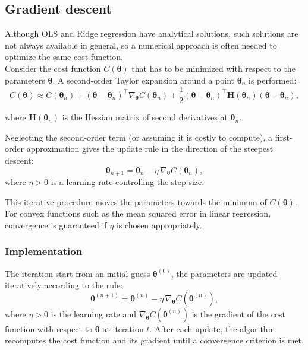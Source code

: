 \documentclass[
 reprint,            %
 amsmath,amssymb,
 aps,
]{revtex4-2}
\begin{document}
\subsection{Gradient descent}

Although OLS and Ridge regression have analytical solutions, such solutions are not always available in general, so a numerical approach is often needed to optimize the same cost function.\\

Consider the cost function $C(\boldsymbol{\theta})$ that has to be minimized with respect to the parameters $\boldsymbol{\theta}$\cite{hjorthjensen_week36}.  
A second-order Taylor expansion around a point $\boldsymbol{\theta}_n$ is performed:
$$
C(\boldsymbol{\theta}) \approx C(\boldsymbol{\theta}_n) + (\boldsymbol{\theta}-\boldsymbol{\theta}_n)^\top \nabla_{\boldsymbol{\theta}} C(\boldsymbol{\theta}_n) 
+ \frac{1}{2} (\boldsymbol{\theta}-\boldsymbol{\theta}_n)^\top \mathbf{H}(\boldsymbol{\theta}_n) (\boldsymbol{\theta}-\boldsymbol{\theta}_n),
$$

where $\mathbf{H}(\boldsymbol{\theta}_n)$ is the Hessian matrix of second derivatives at $\boldsymbol{\theta}_n$.

Neglecting the second-order term (or assuming it is costly to compute), a first-order approximation gives the update rule in the direction of the steepest descent:
\[
\boldsymbol{\theta}_{n+1} = \boldsymbol{\theta}_n - \eta \, \nabla_{\boldsymbol{\theta}} C(\boldsymbol{\theta}_n),
\]
where $\eta > 0$ is a learning rate controlling the step size.  

This iterative procedure moves the parameters towards the minimum of $C(\boldsymbol{\theta})$. For convex functions such as the mean squared error in linear regression, convergence is guaranteed if $\eta$ is chosen appropriately.

\subsubsection{Implementation}
The iteration start from an initial guess $\boldsymbol{\theta}^{(0)}$, the parameters are updated iteratively according to the rule:
\[
\boldsymbol{\theta}^{(n+1)} = \boldsymbol{\theta}^{(n)} - \eta \, \nabla_{\boldsymbol{\theta}} C(\boldsymbol{\theta}^{(n)}),
\]
where $\eta > 0$ is the learning rate and $\nabla_{\boldsymbol{\theta}} C(\boldsymbol{\theta}^{(n)})$ is the gradient of the cost function with respect to $\boldsymbol{\theta}$ at iteration $t$.
After each update, the algorithm recomputes the cost function and its gradient until a convergence criterion is met.\\
\end{document}
